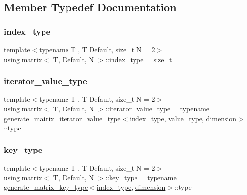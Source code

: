 \subsection{Member Typedef Documentation}
\mbox{\label{structmatrix_aa800607a99454f7d958b4d6565ca9751}} 
\subsubsection{\texorpdfstring{index\+\_\+type}{index\_type}}
{\footnotesize\ttfamily template$<$typename T , T Default, size\+\_\+t N = 2$>$ \\
using \hyperlink{structmatrix}{matrix}$<$ T, Default, N $>$\+::\hyperlink{structmatrix_aa800607a99454f7d958b4d6565ca9751}{index\+\_\+type} =  size\+\_\+t}

\mbox{\label{structmatrix_a54b3613a5cf2df7a45556b017ebe306f}} 
\subsubsection{\texorpdfstring{iterator\+\_\+value\+\_\+type}{iterator\_value\_type}}
{\footnotesize\ttfamily template$<$typename T , T Default, size\+\_\+t N = 2$>$ \\
using \hyperlink{structmatrix}{matrix}$<$ T, Default, N $>$\+::\hyperlink{structmatrix_a54b3613a5cf2df7a45556b017ebe306f}{iterator\+\_\+value\+\_\+type} =  typename \hyperlink{classgenerate__matrix__iterator__value__type}{generate\+\_\+matrix\+\_\+iterator\+\_\+value\+\_\+type}$<$\hyperlink{structmatrix_aa800607a99454f7d958b4d6565ca9751}{index\+\_\+type}, \hyperlink{structmatrix_aeb660563444929ee10d8a0b06d42a951}{value\+\_\+type}, \hyperlink{structmatrix_ad9335b977ea0dfdd152314be10591379}{dimension}$>$\+::type}

\mbox{\label{structmatrix_ae7906bda02f5d7f6744d9545c9465e13}} 
\subsubsection{\texorpdfstring{key\+\_\+type}{key\_type}}
{\footnotesize\ttfamily template$<$typename T , T Default, size\+\_\+t N = 2$>$ \\
using \hyperlink{structmatrix}{matrix}$<$ T, Default, N $>$\+::\hyperlink{structmatrix_ae7906bda02f5d7f6744d9545c9465e13}{key\+\_\+type} =  typename \hyperlink{classgenerate__matrix__key__type}{generate\+\_\+matrix\+\_\+key\+\_\+type}$<$\hyperlink{structmatrix_aa800607a99454f7d958b4d6565ca9751}{index\+\_\+type}, \hyperlink{structmatrix_ad9335b977ea0dfdd152314be10591379}{dimension}$>$\+::type}


